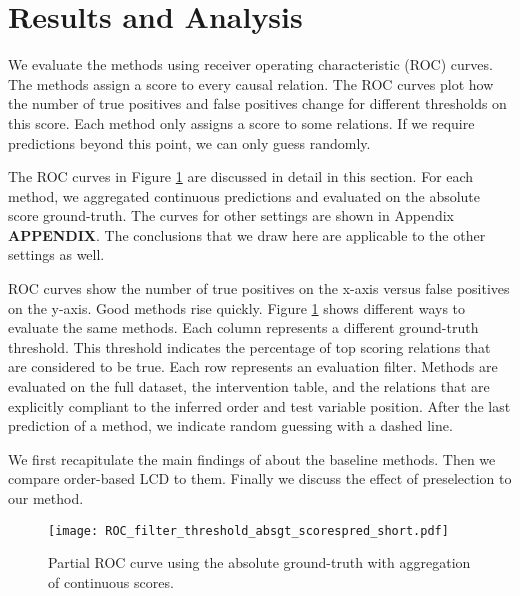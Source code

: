 \newpage
\section{Results and Analysis}
\label{chapter:analysis}






We evaluate the methods using receiver operating characteristic (ROC) curves. The methods assign a score to every causal relation. The ROC curves plot how the number of true positives and false positives change for different thresholds on this score. Each method only assigns a score to some relations. If we require predictions beyond this point, we can only guess randomly. 

The ROC curves in Figure \ref{fig:7:rocshort} are discussed in detail in this section. For each method, we aggregated continuous predictions and evaluated on the absolute score ground-truth. The curves for other settings are shown in Appendix \textbf{APPENDIX}. The conclusions that we draw here are applicable to the other settings as well. 

ROC curves show the number of true positives on the x-axis versus false positives on the y-axis. Good methods rise quickly. Figure \ref{fig:7:rocshort} shows different ways to evaluate the same methods. Each column represents a different ground-truth threshold. This threshold indicates the percentage of top scoring relations that are considered to be true. Each row represents an evaluation filter. Methods are evaluated on the full dataset, the intervention table, and the relations that are explicitly compliant to the inferred order and test variable position. After the last prediction of a method, we indicate random guessing with a dashed line.

We first recapitulate the main findings of \citet{versteeg2019boosting} about the baseline methods. Then we compare order-based LCD to them. Finally we discuss the effect of preselection to our method.

\begin{figure}[h]
    \centering
    \texttt{[image: ROC\_filter\_threshold\_absgt\_scorespred\_short.pdf]}
    \caption{Partial ROC curve using the absolute ground-truth with aggregation of continuous scores.}
    \label{fig:7:rocshort}
\end{figure}


